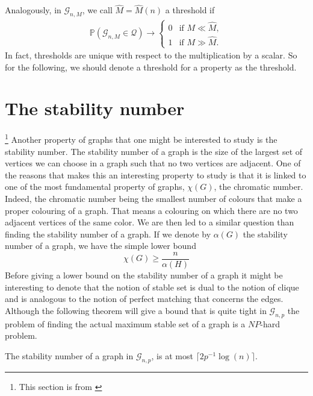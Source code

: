 Analogously, in $\mathcal{G}_{n, M}$, we call $\hat{M} = \hat{M}(n)$ a threshold if
\begin{align}
	\mathbb{P}(\mathcal{G}_{n,M} \in \mathcal{Q}) \rightarrow \left\{\begin{array}{rl}
										0 & \text{if } M \ll \hat{M},\\
										1 & \text{if } M \gg \hat{M}.
									 \end{array}
									\right.
\end{align}
In fact, thresholds are unique with respect to the multiplication by a scalar. So for the following, we should denote a threshold for a property as the threshold.


\section{The stability number}\footnote{This section is from \cite{Bondy08}}
Another property of graphs that one might be interested to study is the stability number. The stability number of a graph is the size of the largest set of vertices we can choose in a graph such that no two vertices are adjacent. 
One of the reasons that makes this an interesting property to study is that it is linked to one of the most fundamental property of graphs, $\chi (G)$, the chromatic number. Indeed, the chromatic number being the smallest number of colours that make a proper colouring of a graph. 
That means a colouring on which there are no two adjacent vertices of the same color. 
We are then led to a similar question than finding the stability number of a graph.
If we denote by $\alpha(G)$ the stability number of a graph, we have the simple lower bound
\begin{equation}
	\chi(G) \geq \frac{n}{\alpha(H)}
\end{equation}
Before giving a lower bound on the stability number of a graph it might be interesting to denote that the notion of stable set is dual to the notion of clique and is analogous to the notion of perfect matching that concerns the edges.
Although the following theorem will give a bound that is quite tight in $\mathcal{G}_{n, p}$ the problem of finding the actual maximum stable set of a graph is a $NP$-hard problem.
\begin{theorem}
	The stability number of a graph in $\mathcal{G}_{n, p}$, is at most $\lceil 2p^{-1}\log(n)\rceil$.
\end{theorem}
